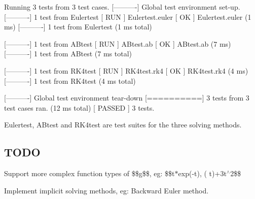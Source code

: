 \begin{DoxyCode}
[==========] Running 3 tests from 3 test cases.
[----------] Global test environment set-up.
[----------] 1 test from Eulertest
[ RUN   ] Eulertest.euler
[       OK ] Eulertest.euler (1 ms)
[----------] 1 test from Eulertest (1 ms total)

[----------] 1 test from ABtest
[ RUN   ] ABtest.ab
[       OK ] ABtest.ab (7 ms)
[----------] 1 test from ABtest (7 ms total)

[----------] 1 test from RK4test
[ RUN   ] RK4test.rk4
[       OK ] RK4test.rk4 (4 ms)
[----------] 1 test from RK4test (4 ms total)

[----------] Global test environment tear-down
[==========] 3 tests from 3 test cases ran. (12 ms total)
[  PASSED  ] 3 tests.
\end{DoxyCode}
 Eulertest, A\+Btest and R\+K4test are test suites for the three solving methods.

\subsection*{T\+O\+DO}


\begin{DoxyItemize}
\item Support more complex function types of \$\$g\$\$, eg\+: \$\$t$\ast$exp(-\/t), ( t)+3t$^\wedge$2\$\$
\item Implement implicit solving methods, eg\+: Backward Euler method. 
\end{DoxyItemize}